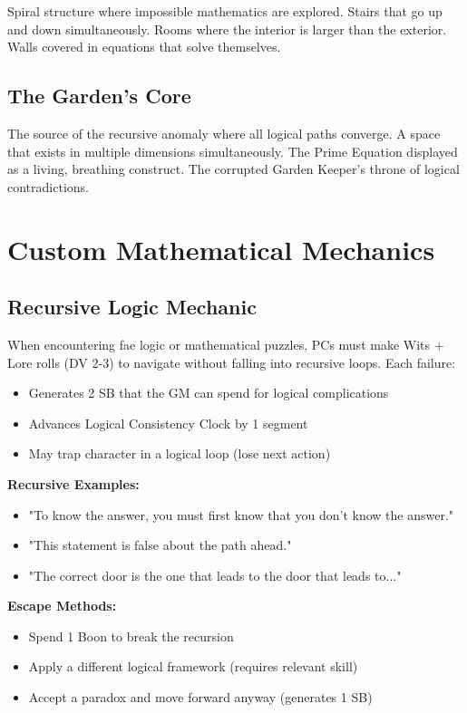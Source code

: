 \documentclass[11pt]{article}
\begin{document}
Spiral structure where impossible mathematics are explored. Stairs that go up and down simultaneously. Rooms where the interior is larger than the exterior. Walls covered in equations that solve themselves.

\subsection{The Garden's Core}

The source of the recursive anomaly where all logical paths converge. A space that exists in multiple dimensions simultaneously. The Prime Equation displayed as a living, breathing construct. The corrupted Garden Keeper's throne of logical contradictions.

\section{Custom Mathematical Mechanics}

\subsection{Recursive Logic Mechanic}

When encountering fae logic or mathematical puzzles, PCs must make Wits + Lore rolls (DV 2-3) to navigate without falling into recursive loops. Each failure:
\begin{itemize}
\item Generates 2 SB that the GM can spend for logical complications
\item Advances Logical Consistency Clock by 1 segment
\item May trap character in a logical loop (lose next action)
\end{itemize}

\textbf{Recursive Examples:}
\begin{itemize}
\item "To know the answer, you must first know that you don't know the answer."
\item "This statement is false about the path ahead."
\item "The correct door is the one that leads to the door that leads to..."
\end{itemize}

\textbf{Escape Methods:}
\begin{itemize}
\item Spend 1 Boon to break the recursion
\item Apply a different logical framework (requires relevant skill)
\item Accept a paradox and move forward anyway (generates 1 SB)
\end{itemize}
\end{document}
